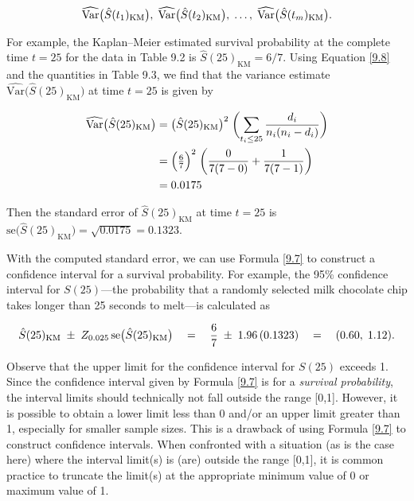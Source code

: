\documentclass[
]{book}
\begin{document}
\begin{align}
\widehat{\mathrm{Var}}\bigl(\hat S(t_1)_{\mathrm{KM}}\bigr),\;\widehat{\mathrm{Var}}\bigl(\hat S(t_2)_{\mathrm{KM}}\bigr),\;\dots,\;\widehat{\mathrm{Var}}\bigl(\hat S(t_m)_{\mathrm{KM}}\bigr).\notag
\end{align}

For example, the Kaplan--Meier estimated survival probability at the complete time \(t=25\) for the data in Table 9.2 is \(\hat S(25)_{\mathrm{KM}} = 6/7\). Using Equation \ref{9.8} and the quantities in Table 9.3, we find that the variance estimate \(\widehat{\mathrm{Var}}\bigl(\hat S(25)_{\mathrm{KM}}\bigr)\) at time \(t=25\) is given by

\begin{align}
\widehat{\mathrm{Var}}\bigl(\hat S(25)_{\mathrm{KM}}\bigr)
&= \bigl(\hat S(25)_{\mathrm{KM}}\bigr)^2 \;\biggl(\sum_{t_i \le 25}\frac{d_i}{n_i(n_i - d_i)}\biggr) \\
&= \Bigl(\tfrac{6}{7}\Bigr)^2 \;\biggl(\frac{0}{7(7-0)} + \frac{1}{7(7-1)}\biggr) \\
&= 0.0175 
\notag
\end{align}

Then the standard error of \(\hat S(25)_{\mathrm{KM}}\) at time \(t=25\) is \(\mathrm{se}\bigl(\hat S(25)_{\mathrm{KM}}\bigr) = \sqrt{0.0175} = 0.1323\).

With the computed standard error, we can use Formula \ref{9.7} to construct a confidence interval for a survival probability. For example, the 95\% confidence interval for \(S(25)\)---the probability that a randomly selected milk chocolate chip takes longer than 25 seconds to melt---is calculated as

\begin{align}
\hat S(25)_{\mathrm{KM}} \;\pm\; Z_{0.025}\,\mathrm{se}\bigl(\hat S(25)_{\mathrm{KM}}\bigr)
\quad=\quad
\frac{6}{7}\;\pm\;1.96\,(0.1323)
\quad=\quad
(0.60,\;1.12).
\notag
\end{align}

Observe that the upper limit for the confidence interval for \(S(25)\) exceeds 1. Since the confidence interval given by Formula \ref{9.7} is for a \emph{survival probability}, the interval limits should technically not fall outside the range {[}0,1{]}. However, it is possible to obtain a lower limit less than 0 and/or an upper limit greater than 1, especially for smaller sample sizes. This is a drawback of using Formula \ref{9.7} to construct confidence intervals. When confronted with a situation (as is the case here) where the interval limit(s) is (are) outside the range {[}0,1{]}, it is common practice to truncate the limit(s) at the appropriate minimum value of 0 or maximum value of 1.
\end{document}

